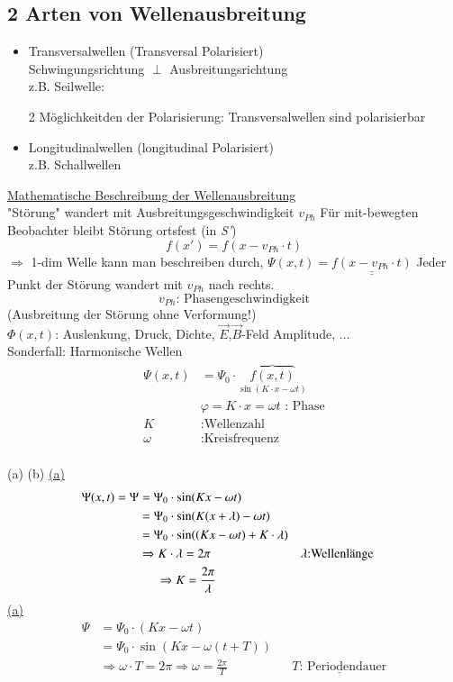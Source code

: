 \subsection{2 Arten von Wellenausbreitung}
\begin{itemize}
	\item Transversalwellen (Transversal Polarisiert) \\
	Schwingungsrichtung $ \perp $ Ausbreitungsrichtung\\
	z.B. Seilwelle:
	\bild
	\begin{center}
		
		2 Möglichkeitden der Polarisierung:
		\bild
		Transversalwellen sind polarisierbar
	\end{center}
	\item Longitudinalwellen (longitudinal Polarisiert)\\
	z.B. Schallwellen
	\bild
\end{itemize}

\underline{Mathematische Beschreibung der Wellenausbreitung}\break \\
"Störung" wandert mit Ausbreitungsgeschwindigkeit $ v_{Ph} $
\bild
\bild
Für mit-bewegten Beobachter bleibt Störung ortsfest (in \emph{S'})
$$ f(x')=f(x-v_{Ph}\cdot t) $$
$ \Rightarrow $ 1-dim Welle kann man beschreiben durch, $ \Psi(x,t) = \underline{\underline{f(x-v_{Ph} \cdot t)}} $ Jeder Punkt der Störung wandert mit $ v_{Ph} $ nach rechts. $$ v_{Ph} \text{: Phasengeschwindigkeit} $$
(Ausbreitung der Störung ohne Verformung!)\\
$ \Phi(x,t) $: Auslenkung, Druck, Dichte, $ \vec{E} $,$ \vec{B} $-Feld Amplitude, ...\\
Sonderfall: Harmonische Wellen
\begin{align*}
\Psi(x,t) &= \Psi_0 \cdot \overbrace{f(x,t)}_{\sin(K\cdot x -\omega t)}\\
& \varphi = K \cdot x = \omega t \text{ : Phase}\\
K&: \text{Wellenzahl}\\
\omega&: \text{Kreisfrequenz}
\end{align*}
\hfill\\
\hypertarget{a}{(a)} \bild
\hypertarget{b}{(b)} \bild
\hyperlink{a}{(a)}
\begin{align*}
\Psi(x,t) = \Psi &= \Psi_0 \cdot \sin(Kx-\omega t)\\
&= \Psi_0 \cdot \sin(K(x+\lambda)-\omega t)\\
&= \Psi_0 \cdot \sin((Kx-\omega t)+K\cdot \lambda)\\
&\Rightarrow K \cdot \lambda = 2\pi &&\lambda \text{:Wellenlänge}\\
&\hspace{5mm} \Rightarrow K = \frac{2\pi}{\lambda}
\end{align*}
\hyperlink{a}{(a)}
\begin{align*}
\Psi &= \Psi_0 \cdot (Kx-\omega t)\\
&= \Psi_0 \cdot \sin(Kx-\omega (t+T))\\
&\Rightarrow\omega \cdot T = 2\pi \Rightarrow \omega = \frac{2\pi}{T} && \underline{T\text{: Periodendauer}}
\end{align*}

